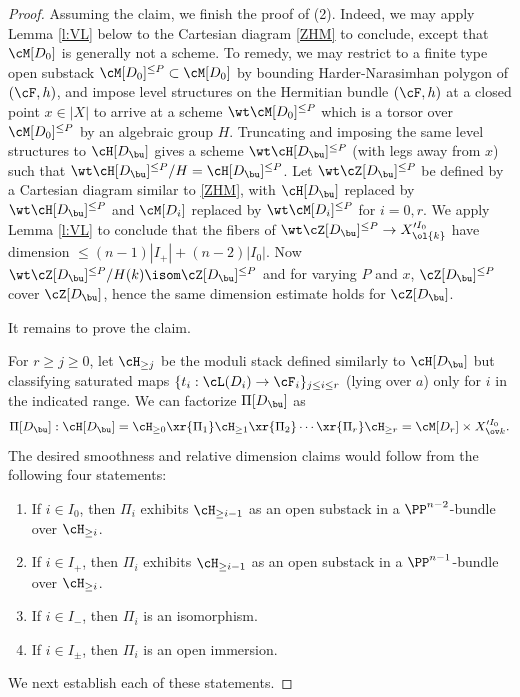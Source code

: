 \begin{proof}
Assuming the claim, we finish the proof of (2). Indeed, we may apply Lemma \ref{l:VL} below to the Cartesian diagram \eqref{ZHM} to conclude, except that $\cM[D_{0}]$ is generally not a scheme. To remedy, we may restrict to a finite type open substack  $\cM[D_{0}]^{\le P}\subset \cM[D_{0}]$ by bounding Harder-Narasimhan polygon of $(\cF,h)$, and impose level structures on the Hermitian bundle $(\cF,h)$ at a closed point $x\in |X|$ to arrive at a scheme $\wt\cM[D_{0}]^{\le P}$ which is a torsor over $\cM[D_{0}]^{\le P}$ by an algebraic group $H$. Truncating and imposing the same level structures to $\cH[D_{\bu}]$ gives a  scheme $\wt\cH[D_{\bu}]^{\le P}$ (with legs away from $x$) such that $\wt\cH[D_{\bu}]^{\le P}/H=\cH[D_{\bu}]^{\le P}$. Let $\wt\cZ[D_{\bu}]^{\le P}$ be defined by a Cartesian diagram similar to \eqref{ZHM}, with $\cH[D_{\bu}]$ replaced by $\wt\cH[D_{\bu}]^{\le P}$ and $\cM[D_{i}]$ replaced by $\wt\cM[D_{i}]^{\le P}$ for $i=0,r$. We apply  Lemma \ref{l:VL} to conclude that the fibers of $\wt \cZ[D_{\bu}]^{\le P}\to X'^{I_{0}}_{\ol{k}}$ have dimension $\le (n-1)|I_{+}|+(n-2)|I_{0}|$. Now $\wt \cZ[D_{\bu}]^{\le P}/H(k)\isom \cZ[D_{\bu}]^{\le P}$ and for varying $P$ and $x$, $\cZ[D_{\bu}]^{\le P}$ cover $\cZ[D_{\bu}]$, hence the same dimension estimate holds for $\cZ[D_{\bu}]$.
%

It remains to prove the claim.

For $r\ge j\ge 0$, let $\cH_{\ge j}$ be the moduli stack defined similarly to $\cH[D_{\bu}]$ but classifying saturated maps $\{t_{i}: \cL(D_{i}) \to \cF_{i}\}_{j\le i\le r}$ (lying over $a$) only for $i$ in the indicated range. We can factorize $\Pi[D_{\bu}]$ as
\begin{equation}
\Pi[D_{\bu}]: \cH[D_{\bu}]=\cH_{\ge0} \xr{ \Pi_{1}} \cH_{\ge1}\xr{\Pi_{2} }\cdots \xr{ \Pi_{r}}\cH_{\ge r}=\cM[D_{r}]\times X'^{I_{0}}_{\ov k}.
\end{equation}
The desired smoothness and relative dimension claims would follow from the following four statements:
\begin{enumerate}
\item[($H0$)] If $i\in I_{0}$, then $\Pi_{i}$ exhibits $\cH_{\ge i-1}$ as an open substack in a $\PP^{n-2}$-bundle over $\cH_{\ge i}$.
\item[($H+$)] If $i\in I_{+}$, then $\Pi_{i}$ exhibits $\cH_{\ge i-1}$ as an open substack in a $\PP^{n-1}$-bundle over $\cH_{\ge i}$.
\item[($H-$)] If $i\in I_{-}$, then $\Pi_{i}$ is an isomorphism.
\item[($H\pm$)] If $i\in I_{\pm}$, then $\Pi_{i}$ is an open immersion.
\end{enumerate}
We next establish each of these statements.


\end{proof}
